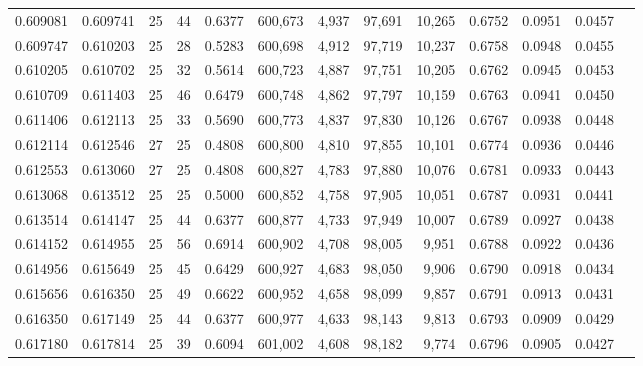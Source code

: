 \begin{tabular}{rrrrrrrrrrrrr}
0.609081 & 0.609741 &    25 &  44 &                                     0.6377 & 600,673 &   4,937 &  97,691 &  10,265 & 0.6752 & 0.0951 & 0.0457 \\
0.609747 & 0.610203 &    25 &  28 &                                     0.5283 & 600,698 &   4,912 &  97,719 &  10,237 & 0.6758 & 0.0948 & 0.0455 \\
0.610205 & 0.610702 &    25 &  32 &                                     0.5614 & 600,723 &   4,887 &  97,751 &  10,205 & 0.6762 & 0.0945 & 0.0453 \\
0.610709 & 0.611403 &    25 &  46 &                                     0.6479 & 600,748 &   4,862 &  97,797 &  10,159 & 0.6763 & 0.0941 & 0.0450 \\
0.611406 & 0.612113 &    25 &  33 &                                     0.5690 & 600,773 &   4,837 &  97,830 &  10,126 & 0.6767 & 0.0938 & 0.0448 \\
0.612114 & 0.612546 &    27 &  25 &                                     0.4808 & 600,800 &   4,810 &  97,855 &  10,101 & 0.6774 & 0.0936 & 0.0446 \\
0.612553 & 0.613060 &    27 &  25 &                                     0.4808 & 600,827 &   4,783 &  97,880 &  10,076 & 0.6781 & 0.0933 & 0.0443 \\
0.613068 & 0.613512 &    25 &  25 &                                     0.5000 & 600,852 &   4,758 &  97,905 &  10,051 & 0.6787 & 0.0931 & 0.0441 \\
0.613514 & 0.614147 &    25 &  44 &                                     0.6377 & 600,877 &   4,733 &  97,949 &  10,007 & 0.6789 & 0.0927 & 0.0438 \\
0.614152 & 0.614955 &    25 &  56 &                                     0.6914 & 600,902 &   4,708 &  98,005 &   9,951 & 0.6788 & 0.0922 & 0.0436 \\
0.614956 & 0.615649 &    25 &  45 &                                     0.6429 & 600,927 &   4,683 &  98,050 &   9,906 & 0.6790 & 0.0918 & 0.0434 \\
0.615656 & 0.616350 &    25 &  49 &                                     0.6622 & 600,952 &   4,658 &  98,099 &   9,857 & 0.6791 & 0.0913 & 0.0431 \\
0.616350 & 0.617149 &    25 &  44 &                                     0.6377 & 600,977 &   4,633 &  98,143 &   9,813 & 0.6793 & 0.0909 & 0.0429 \\
0.617180 & 0.617814 &    25 &  39 &                                     0.6094 & 601,002 &   4,608 &  98,182 &   9,774 & 0.6796 & 0.0905 & 0.0427 \\

\end{tabular}
